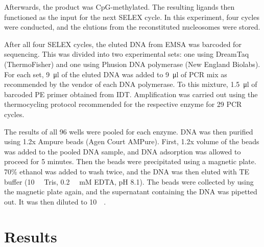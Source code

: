 \documentclass[parskip=full, numbers=noenddot]{scrreprt}
\begin{document}
Afterwards, the product was CpG-methylated. The resulting ligands then functioned as the input for the next SELEX cycle. In this experiment, four cycles were conducted, and the elutions from the reconstituted nucleosomes were stored.


After all four SELEX cycles, the eluted DNA from EMSA was barcoded for sequencing. This was divided into two experimental sets: one using DreamTaq (ThermoFisher) and one using Phusion DNA polymerase (New England Biolabs). For each set, \SI{9}{\micro\litre} of the eluted DNA was added to \SI{9}{\micro\litre} of PCR mix as recommended by the vendor of each DNA polymerase. To this mixture, \SI{1.5}{\micro\litre} of barcoded PE primer obtained from IDT. Amplification was carried out using the thermocycling protocol recommended for the respective enzyme for 29 PCR cycles.

The results of all 96 wells were pooled for each enzyme. DNA was then purified using 1.2x Ampure beads (Agen Court AMPure). First, 1.2x volume of the beads was added to the pooled DNA sample, and DNA adsorption was allowed to proceed for 5 minutes. Then the beads were precipitated using a magnetic plate. 70\% ethanol was added to wash twice, and the DNA was then eluted with TE buffer (\SI{10}{\milli\Molar} Tris, \SI{0.2}{\milli\Molar} mM EDTA, pH 8.1). The beads were collected by using the magnetic plate again, and the supernatant containing the DNA was pipetted out. It was then diluted to \SI{10}{\nano\Molar}.


\section{Results}
\label{sec:emsaselex_results}
\end{document}
